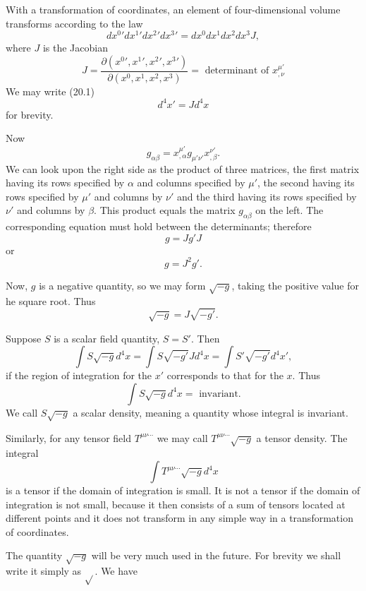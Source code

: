 With a transformation of coordinates, an element of four-dimensional volume transforms according to the law
\begin{equation}
 \label{ecuacion 20.1}
 {dx^0}'{dx^1}'{dx^2}'{dx^3}' = {dx^0}{dx^1}{dx^2}{dx^3} J,
\end{equation}
where $J$ is the Jacobian
\[
 J = \frac{\partial({x^0}',{x^1}',{x^2}',{x^3}')}{\partial({x^0},{x^1},{x^2},{x^3})}
 = \mbox{ determinant of } x^{\mu'}_{,\nu}
\]
We may write (20.1)
\[
 d^4 x' = J d^4 x
\]
for brevity.

Now
\[
   g_{\alpha\beta} = x^{\mu'}_{,\alpha} g_{\mu'\nu'} x^{\nu'}_{,\beta}.
\]
We can look upon the right side as the product of three matrices, the first matrix having its rows specified by 
$\alpha$ and columns specified by $\mu'$, the second having its rows specified by $\mu'$ and columns by $\nu'$ and the 
third having its rows specified by $\nu'$ and columns by $\beta$. This product equals the matrix $g_{\alpha\beta}$ on 
the left. The corresponding equation must hold between the determinants; therefore
\[
 g = J g' J
\]
or
\[
 g = J^2 g'.
\]

Now, $g$ is a negative quantity, so we may form $\sqrt{-g}$, taking the positive value for he square root. Thus
\begin{equation}
 \label{ecuacion 20.3}
 \sqrt{-g} = J \sqrt{- g'}.
\end{equation}

Suppose $S$ is a scalar field quantity, $S = S'$. Then
\[
\int{S \sqrt{-g} d^4 x} = \int{S \sqrt{-g'} J d^4 x} = \int{S' \sqrt{-g'} d^4 x'},
\]
if the region of integration for the $x'$ corresponds to that for the $x$. Thus
\begin{equation}
 \label{ecuacion 20.4}
 \int{S \sqrt{-g} d^4 x} = \mbox{ invariant.}
\end{equation}
We call $S \sqrt{-g}$ a scalar density, meaning a quantity whose integral is invariant.

Similarly, for any tensor field $T^{\mu\nu\cdots}$ we may call $T^{\mu\nu\cdots}\sqrt{-g}$ a tensor density. The 
integral
\[
   \int{T^{\mu\nu\cdots}\sqrt{-g} d^4 x}
\]
is a tensor if the domain of integration is small. It is not a tensor if the domain of integration is not small, 
because it then consists of a sum of tensors located at different points and it does not transform in any simple way in 
a transformation of coordinates.

The quantity $\sqrt{-g}$ will be very much used in the future. For brevity we shall write it simply as $\sqrt{}$. We 
have


